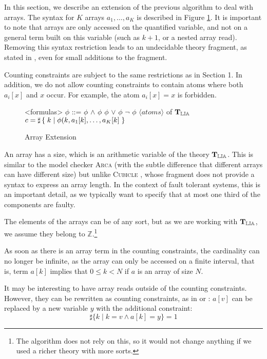
In this section, we describe an extension of the previous algorithm to
deal with arrays. The syntax for $K$ arrays $a_1, \ldots, a_K$ is
described in Figure \ref{syntaxarray}. It is important to note that
arrays are only accessed on the quantified variable, and not on a
general term built on this variable (such as $k + 1$, or a nested
array read). Removing this syntax restriction leads to an undecidable
theory fragment, as stated in
\cite{bradley2006s}, even for small additions to the
fragment.

Counting constraints are subject to the same restrictions as in
Section 1. In addition, we do not allow counting constraints to 
contain atoms where both $a_i[x]$ and $x$ occur. For example, the 
atom $a_i[x] = x$ is forbidden.

\begin{figure}[h]
\begin{grammar}

<formulas> $\phi$ ::= $\phi$ $\land$ $\phi$
\alt $\phi$ $\lor$ $\phi$
\alt $\lnot$ $\phi$
\alt $\langle atoms\rangle$ of $\operatorname{\mathbf{T}_{\mathbb{LIA}}}$
\alt $c = \sharp\left\lbrace\;k\;|\;\phi(k, a_1[k], \ldots, a_K[k]\;\right\rbrace$

\end{grammar}
\caption{Array Extension}
\label{syntaxarray}
\end{figure}


An array has a size, which is an arithmetic variable of the theory
$\operatorname{\mathbf{T}_{\mathbb{LIA}}}$. This is similar to the model checker \textsc{Arca}
\cite{AlbertiGP16} (with the subtle difference that
different arrays can have different size) but unlike \textsc{Cubicle}
\cite{ConchonGKMZ12}, whose fragment does not
provide a syntax to express an array length. In the context of fault
tolerant systems, this is an important detail, as we typically want to
specify that at most one third of the components are faulty.

The elements of the arrays can be of any sort, but as we are working with
$\operatorname{\mathbf{T}_{\mathbb{LIA}}}$, we assume they belong to $\mathbb{Z}.$\footnote{The algorithm does
not rely on this, so it would not change anything if we used a richer theory with
more sorts.}

As soon as there is an array term in the counting constraints, the
cardinality can no longer be infinite, as the array can only be accessed
on a finite interval, that is, term $a[k]$ implies that $0 \le k < N$ if $a$ is an array of size $N$.

It may be interesting to have array reads outside of the counting
constraints. However, they can be rewritten as counting constraints, as in
\cite{bradley2006s} or
\cite{AlbertiGP16}: $a[v]$ can be replaced by a new variable $y$ with the additional constraint:
\begin{equation}
\sharp\{k\mid k = v \land a[k] = y\} = 1
\end{equation}

